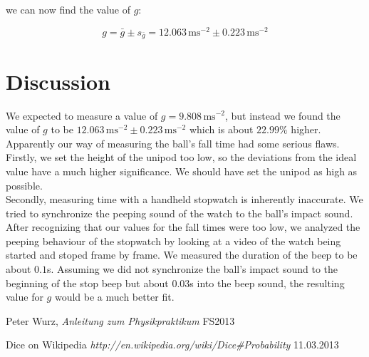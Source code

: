 \documentclass{scrreprt}
\newcommand{\unit}[1]{\ensuremath{\, \mathrm{#1}}}
\begin{document}
we can now find the value of $g$:

\begin{equation}
g = \bar{g} \pm s_{\bar{g}} = 12.063\unit{m s^{-2}} \pm 0.223\unit{m s^{-2}}
\end{equation}

\section{Discussion}
We expected to measure a value of $g = 9.808\unit{ms^{-2}}$, but instead we found the value of $g$ to be $12.063\unit{m s^{-2}} \pm 0.223\unit{m s^{-2}}$ which is about $22.99\%$ higher.\\
Apparently our way of measuring the ball's fall time had some serious flaws.\\
Firstly, we set the height of the unipod too low, so the deviations from the ideal value have a much higher significance. We should have set the unipod as high as possible.\\
Secondly, measuring time with a handheld stopwatch is inherently inaccurate. We tried to synchronize the peeping sound of the watch to the ball's impact sound. After recognizing that our values for the fall times were too low, we analyzed the peeping behaviour of the stopwatch by looking at a video of the watch being started and stoped frame by frame. We measured the duration of the beep to be about $0.1$s. Assuming we did not synchronize the ball's impact sound to the beginning of the stop beep but about $0.03$s into the beep sound, the resulting value for $g$ would be a much better fit.

\begin{thebibliography}{9}

  Peter Wurz,
  \emph{Anleitung zum Physikpraktikum}
  FS2013
  
	Dice on Wikipedia
	\emph{http://en.wikipedia.org/wiki/Dice\#Probability}
	11.03.2013

\end{thebibliography}
\end{document}
